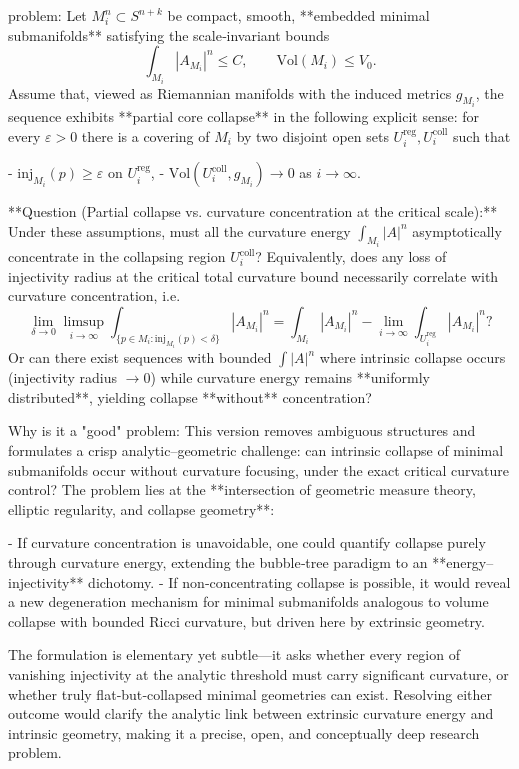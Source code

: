 problem:  
Let \( M_i^n \subset S^{n+k} \) be compact, smooth, **embedded minimal submanifolds** satisfying the scale‑invariant bounds
\[
\int_{M_i} |A_{M_i}|^n \le C,\qquad \mathrm{Vol}(M_i) \le V_0.
\]
Assume that, viewed as Riemannian manifolds with the induced metrics \(g_{M_i}\), the sequence exhibits **partial core collapse** in the following explicit sense: for every \(\varepsilon>0\) there is a covering of \(M_i\) by two disjoint open sets \(U_i^\mathrm{reg}, U_i^\mathrm{coll}\) such that

- \(\mathrm{inj}_{M_i}(p)\ge \varepsilon\) on \(U_i^\mathrm{reg}\),  
- \(\mathrm{Vol}(U_i^\mathrm{coll},g_{M_i})\to 0\) as \(i\to\infty\).

  
**Question (Partial collapse vs. curvature concentration at the critical scale):**  
Under these assumptions, must all the curvature energy  
\(\int_{M_i}|A|^n\) asymptotically concentrate in the collapsing region \(U_i^\mathrm{coll}\)?  Equivalently, does any loss of injectivity radius at the critical total curvature bound necessarily correlate with curvature concentration, i.e.
\[
\lim_{\delta\to0}\limsup_{i\to\infty}\int_{\{p\in M_i:\mathrm{inj}_{M_i}(p)<\delta\}} |A_{M_i}|^n = 
\int_{M_i}|A_{M_i}|^n - \lim_{i\to\infty}\int_{U_i^\mathrm{reg}} |A_{M_i}|^n ?
\]
Or can there exist sequences with bounded \(\int |A|^n\) where intrinsic collapse occurs (injectivity radius \(\to0\)) while curvature energy remains **uniformly distributed**, yielding collapse **without** concentration?

Why is it a "good" problem:  
This version removes ambiguous structures and formulates a crisp analytic–geometric challenge: can intrinsic collapse of minimal submanifolds occur without curvature focusing, under the exact critical curvature control?  The problem lies at the **intersection of geometric measure theory, elliptic regularity, and collapse geometry**:

- If curvature concentration is unavoidable, one could quantify collapse purely through curvature energy, extending the bubble‑tree paradigm to an **energy–injectivity** dichotomy.
- If non‑concentrating collapse is possible, it would reveal a new degeneration mechanism for minimal submanifolds analogous to volume collapse with bounded Ricci curvature, but driven here by extrinsic geometry.

The formulation is elementary yet subtle—it asks whether every region of vanishing injectivity at the analytic threshold must carry significant curvature, or whether truly flat‑but‑collapsed minimal geometries can exist.  Resolving either outcome would clarify the analytic link between extrinsic curvature energy and intrinsic geometry, making it a precise, open, and conceptually deep research problem.